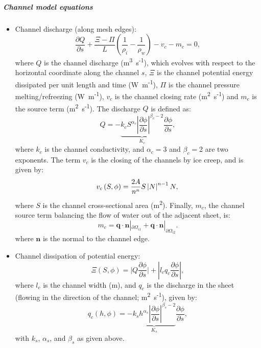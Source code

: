 \subparagraph{Channel model equations}
\begin{itemize}
	\item Channel discharge (along mesh edges):
	\begin{equation}
		\frac{\partial Q}{\partial s} + \frac{\Xi-\Pi}{L}\left(\frac{1}{\rho_i} - \frac{1}{\rho_w}\right) - v_c - m_c = 0,
	\end{equation}
	where $Q$ is the channel discharge (m\textsuperscript{3}~s\textsuperscript{-1}), which evolves with respect to the horizontal coordinate along the channel $s$, $\Xi$ is the channel potential energy dissipated per unit length and time (W~m\textsuperscript{-1}), $\Pi$ is the channel pressure melting/refreezing (W~m\textsuperscript{-1}), $v_c$ is the channel closing rate (m\textsuperscript{2}~s\textsuperscript{-1}) and $m_c$ is the source term (m\textsuperscript{2}~s\textsuperscript{-1}). The discharge $Q$ is defined as:
	\begin{equation}
		Q= -\underbrace{k_cS^{\alpha_c}\left|\frac{\partial\phi}{\partial s}\right|^{\beta_c-2}}_{K_c}
		\frac{\partial\phi}{\partial s},
	\end{equation}
	where $k_c$ is the channel conductivity, and $\alpha_c$$=$3 and $\beta_c$$=$2 are two exponents. The term $v_c$ is the closing of the channels by ice creep, and is given by:
	\begin{equation}
		v_c\left(S,\phi\right) = \frac{2A}{n^n}S\left|N\right|^{n-1}N,\\
	\end{equation}
	where $S$ is the channel cross-sectional area (m\textsuperscript{2}). Finally, $m_c$, the channel source term balancing the flow of water out of the adjacent sheet, is: 
	\begin{equation}
		m_c = \boldsymbol{q}\cdot\boldsymbol{n}|_{\partial{\Omega_{i1}} } +
		\boldsymbol{q}\cdot\boldsymbol{n}|_{\partial{\Omega_{i2}} }.
	\end{equation}
	where $\boldsymbol{n}$ is the normal to the channel edge.
\end{itemize}

\begin{itemize}
	\item Channel dissipation of potential energy:
	\begin{equation}
		\Xi(S,\phi)=\Biggl|Q\frac{\partial\phi}{\partial s}\Biggr| +
		\left|l_cq_c\frac{\partial\phi}{\partial s}\right|,
	\end{equation}
	where $l_c$ is the channel width (m), and $q_c$ is the discharge in the sheet (flowing in the direction of the channel; m\textsuperscript{2}~s\textsuperscript{-1}), given by:
	\begin{equation}
		q_c\left(h,\phi\right)
		= -\underbrace{k_s h^{\alpha_s} \left|\frac{\partial\phi}{\partial s}\right|^{\beta_s-2}}_{K_s}
		\frac{\partial\phi}{\partial s},
	\end{equation}
	with $k_s$, $\alpha_s$, and $\beta_s$ as given above.
\end{itemize}

